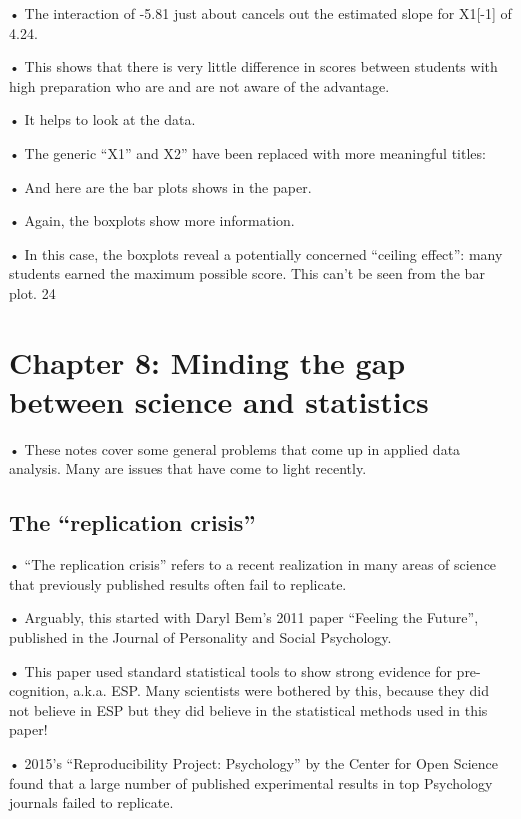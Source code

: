 \documentclass[
  letterpaper,
  DIV=11,
  numbers=noendperiod]{scrreprt}
\begin{document}
• The interaction of -5.81 just about cancels out the estimated slope
for X1{[}-1{]} of 4.24.

• This shows that there is very little difference in scores between
students with high preparation who are and are not aware of the
advantage.

• It helps to look at the data.

• The generic ``X1'' and X2'' have been replaced with more meaningful
titles:

• And here are the bar plots shows in the paper.

• Again, the boxplots show more information.

• In this case, the boxplots reveal a potentially concerned ``ceiling
effect'': many students earned the maximum possible score. This can't be
seen from the bar plot. 24


\hypertarget{chapter-8-minding-the-gap-between-science-and-statistics}{%
\chapter{Chapter 8: Minding the gap between science and
statistics}\label{chapter-8-minding-the-gap-between-science-and-statistics}}

• These notes cover some general problems that come up in applied data
analysis. Many are issues that have come to light recently.

\hypertarget{the-replication-crisis}{%
\section{The ``replication crisis''}\label{the-replication-crisis}}

• ``The replication crisis'' refers to a recent realization in many
areas of science that previously published results often fail to
replicate.

• Arguably, this started with Daryl Bem's 2011 paper ``Feeling the
Future'', published in the Journal of Personality and Social Psychology.

• This paper used standard statistical tools to show strong evidence for
pre-cognition, a.k.a. ESP. Many scientists were bothered by this,
because they did not believe in ESP but they did believe in the
statistical methods used in this paper!

• 2015's ``Reproducibility Project: Psychology'' by the Center for Open
Science found that a large number of published experimental results in
top Psychology journals failed to replicate.
\end{document}
